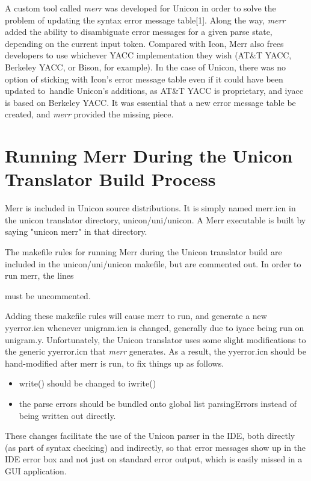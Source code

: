 \documentclass[letterpaper]{article}
\begin{document}
A custom tool called {\em merr\/} was developed for Unicon in order to
solve the problem of updating the syntax error message table[1].  Along
the way, {\em merr\/} added the ability to disambiguate error
messages for a given parse state, depending on the current input token.
Compared with Icon, Merr also frees developers to use whichever
YACC implementation they wish (AT\&T YACC, Berkeley YACC, or Bison,
for example). In the case of Unicon, there was no option of sticking
with Icon's error message table even if it could have been updated to\
handle Unicon's additions, as AT\&T YACC is proprietary, and
iyacc is based on Berkeley YACC. It was essential that a new error
message table be created, and {\em merr\/} provided the missing piece.

\section{Running Merr During the Unicon Translator Build Process}

Merr is included in Unicon source distributions. It is simply named
merr.icn in the unicon translator directory, unicon/uni/unicon.
A Merr executable is built by saying "unicon merr" in that directory.

The makefile rules for running Merr during the Unicon translator build
are included in the unicon/uni/unicon makefile, but are commented out.
In order to run merr, the lines


\noindent must be uncommented.

Adding these makefile rules will cause merr to run, and generate a new
yyerror.icn whenever unigram.icn is changed, generally due to iyacc
being run on unigram.y.  Unfortunately, the Unicon translator uses
some slight modifications to the generic yyerror.icn that {\em merr\/}
generates. As a result, the yyerror.icn should be hand-modified after
merr is run, to fix things up as follows.

\begin{itemize}
\item write() should be changed to iwrite()
\item the parse errors should be bundled onto global list
      parsingErrors instead of being written out directly.
\end{itemize}

These changes facilitate the use of the Unicon parser in the IDE, both
directly (as part of syntax checking) and indirectly, so that error
messages show up in the IDE error box and not just on standard error
output, which is easily missed in a GUI application.
\end{document}
